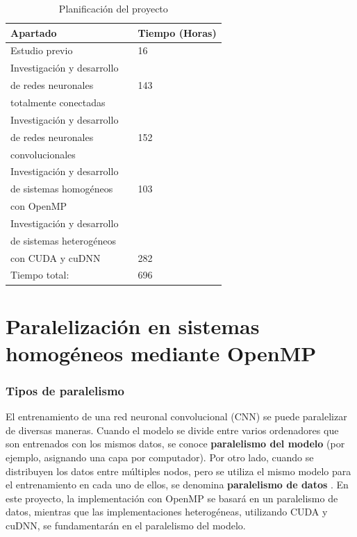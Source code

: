 \begin{table}[H]
	\centering
	\begin{tabular}{|lll|}
		\hline
		Apartado 	 &\vline  & Tiempo (Horas) \\
		\hline
		
		Estudio previo    & \vline & 16 \\			
		\hline
		Investigación y desarrollo  	 & \vline & 	\\
		de redes neuronales  	 & \vline & 143	\\
		totalmente conectadas 	 & \vline & 	\\
		\hline
		Investigación y desarrollo    & \vline & 	 \\	
		de redes neuronales    & \vline & 152	 \\			
		convolucionales    & \vline & 	 \\					
		\hline
		Investigación y desarrollo  	 & \vline & 	 \\
		de sistemas homogéneos  	 & \vline & 103	 \\
		con OpenMP 	 & \vline & 	 \\
		\hline
		Investigación y desarrollo     & \vline &  	\\
		de sistemas heterogéneos    & \vline &  \\ 
		con CUDA y cuDNN    & \vline & 282 \\ 	
		\hline
		\hline
		Tiempo total:				& \vline & 696 \\
		\hline
	\end{tabular}
	\caption{Planificación del proyecto}
	\label{tabla_planificación}
\end{table}


\section{Paralelización en sistemas homogéneos mediante OpenMP}

\subsubsection{Tipos de paralelismo}

El entrenamiento de una red neuronal convolucional (CNN) se puede paralelizar de diversas maneras. Cuando el modelo se divide entre varios ordenadores que son entrenados con los mismos datos, se conoce \textbf{paralelismo del modelo} \cite{data_model_parallelism} (por ejemplo, asignando una capa por computador). Por otro lado, cuando se distribuyen los datos entre múltiples nodos, pero se utiliza el mismo modelo para el entrenamiento en cada uno de ellos, se denomina \textbf{paralelismo de datos} \cite{model_parallelism}. En este proyecto, la implementación con OpenMP se basará en un paralelismo de datos, mientras que las implementaciones heterogéneas, utilizando CUDA y cuDNN, se fundamentarán en el paralelismo del modelo. \\


